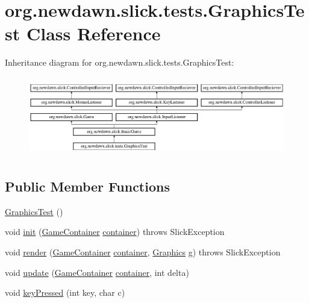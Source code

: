 \hypertarget{classorg_1_1newdawn_1_1slick_1_1tests_1_1_graphics_test}{}\section{org.\+newdawn.\+slick.\+tests.\+Graphics\+Test Class Reference}
\label{classorg_1_1newdawn_1_1slick_1_1tests_1_1_graphics_test}
Inheritance diagram for org.\+newdawn.\+slick.\+tests.\+Graphics\+Test\+:\begin{figure}[H]
\begin{center}
\leavevmode
\includegraphics[height=3.522012cm]{classorg_1_1newdawn_1_1slick_1_1tests_1_1_graphics_test}
\end{center}
\end{figure}
\subsection*{Public Member Functions}
\begin{DoxyCompactItemize}
\item 
\mbox{\hyperlink{classorg_1_1newdawn_1_1slick_1_1tests_1_1_graphics_test_abb433e8bd2e5a754719a759827e94029}{Graphics\+Test}} ()
\item 
void \mbox{\hyperlink{classorg_1_1newdawn_1_1slick_1_1tests_1_1_graphics_test_abd7a7a26ad7740e3443fea07bbb2577c}{init}} (\mbox{\hyperlink{classorg_1_1newdawn_1_1slick_1_1_game_container}{Game\+Container}} \mbox{\hyperlink{classorg_1_1newdawn_1_1slick_1_1tests_1_1_graphics_test_a5484b72803a02c8eba6188f08e274f32}{container}})  throws Slick\+Exception 
\item 
void \mbox{\hyperlink{classorg_1_1newdawn_1_1slick_1_1tests_1_1_graphics_test_a099b363f8b871ccc6da41e172c7ceeb6}{render}} (\mbox{\hyperlink{classorg_1_1newdawn_1_1slick_1_1_game_container}{Game\+Container}} \mbox{\hyperlink{classorg_1_1newdawn_1_1slick_1_1tests_1_1_graphics_test_a5484b72803a02c8eba6188f08e274f32}{container}}, \mbox{\hyperlink{classorg_1_1newdawn_1_1slick_1_1_graphics}{Graphics}} g)  throws Slick\+Exception 
\item 
void \mbox{\hyperlink{classorg_1_1newdawn_1_1slick_1_1tests_1_1_graphics_test_aba6467ff04e7fa1f1ae8930ab9d6949a}{update}} (\mbox{\hyperlink{classorg_1_1newdawn_1_1slick_1_1_game_container}{Game\+Container}} \mbox{\hyperlink{classorg_1_1newdawn_1_1slick_1_1tests_1_1_graphics_test_a5484b72803a02c8eba6188f08e274f32}{container}}, int delta)
\item 
void \mbox{\hyperlink{classorg_1_1newdawn_1_1slick_1_1tests_1_1_graphics_test_a36789cd962301ed1cef2b20092396cfa}{key\+Pressed}} (int key, char c)
\end{DoxyCompactItemize}
